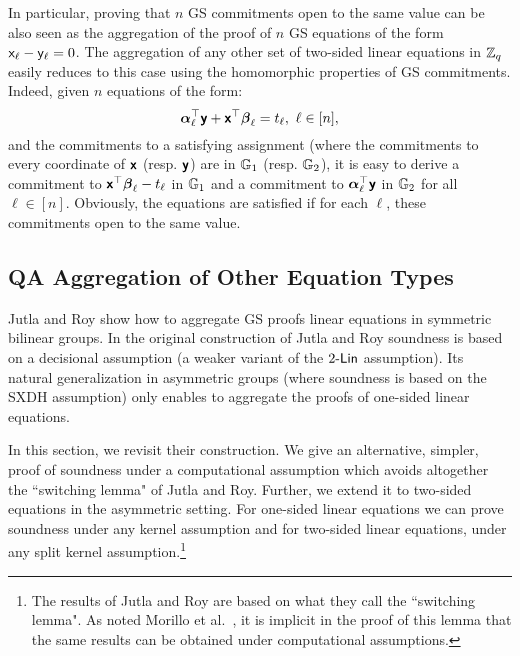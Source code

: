 In particular, proving that $n$ GS commitments open to the same value can be also seen as the aggregation of the proof  of $n$ GS equations of the form $\mathsf{x}_\ell -\mathsf{y}_\ell=0$. The aggregation of any other set of two-sided linear equations in $\mathbb{Z}_q$
easily reduces to this case using the homomorphic properties of GS commitments. Indeed, given $n$ equations of the form:
 $$  {\boldsymbol \alpha}_{\ell}^{\top} \textbf{\textsf{y}}+ \textbf{\textsf{x}}^{\top}\boldsymbol \beta_{\ell} =t_\ell, \ \ell \in [n],$$
 and the commitments to a satisfying assignment (where the commitments to every coordinate of $\textbf{\textsf{x}}$ (resp. $\textbf{\textsf{y}}$) are in $\mathbb{G}_1$ (resp. $\mathbb{G}_2$), it is easy to derive a commitment to $\textbf{\textsf{x}}^{\top} {\boldsymbol \beta}_{\ell}- t_{\ell}$ in $\mathbb{G}_1$ and a commitment to  ${\boldsymbol \alpha}_{\ell}^{\top} \textbf{\textsf{y}}$ in $\mathbb{G}_2$ for all $\ell \in [n]$. Obviously, the equations are satisfied if for each $\ell$, these commitments open to the same value. 


\subsection{QA Aggregation of Other Equation Types} \label{sec:jutroyaggasym}
Jutla and Roy \cite{C:JutRoy14} show how to aggregate GS proofs linear equations in symmetric bilinear groups. In the original construction of Jutla and Roy soundness is based on a decisional assumption (a weaker variant of the $2\mbox{-}\mathsf{Lin}$ assumption). Its natural generalization in asymmetric groups (where soundness is based on the SXDH assumption) only enables to aggregate the proofs of one-sided linear equations. 

In this section, we revisit their construction. We give an alternative, simpler, proof of soundness under a computational assumption which avoids altogether the ``switching lemma" of Jutla and Roy. Further, we extend it to two-sided equations in the asymmetric setting. For one-sided linear equations we can prove soundness under any kernel assumption and for two-sided linear equations, under any split kernel assumption.\footnote{The results of Jutla and Roy are based on what they call  the ``switching lemma". As noted Morillo et al.~\cite{EPRINT:MorRafVil15}, it is implicit in the proof of this lemma that the same results can be obtained under computational assumptions.}

